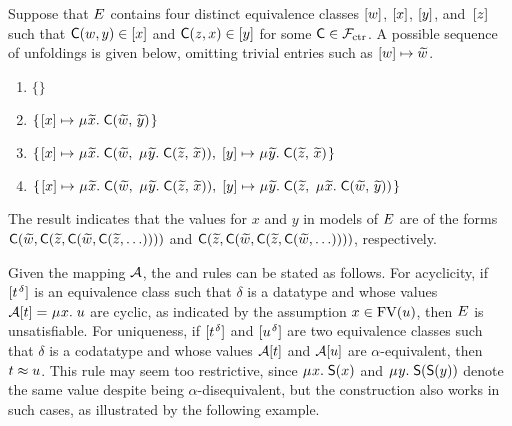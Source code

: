 \begin{examplex}
Suppose that $E$ contains four distinct equivalence classes $[w]$, $[x]$, $[y]$, and~$[z]$
such that $\textsf{C}(w,y) \in [x]$ and $\textsf{C}(z,x) \in [y]$ for some $\textsf{C} \in \mathcal{F}_{\mathrm{ctr}}$.
A possible sequence of unfoldings is given below, omitting
trivial entries such as $[w] \mapsto {\widetilde{w}}$.
%
\begin{enumerate}
\item \noindent{}$\{  \}$
\item \noindent{}$\{\vthinspace  \ec{x} \mapsto \MU {\Varec{x}}.\; \const{C}( {\Varec{w}},\, {\Varec{y}} ) \vthinspace\}$
\item \noindent{}$\{\vthinspace  \ec{x} \mapsto \MU {\Varec{x}}.\; \const{C}( {\Varec{w}},\; \MU {\Varec{y}}.\; \const{C}( {\Varec{z}},\, {\Varec{x}} ) ),\;
  \ec{y} \mapsto \MU {\Varec{y}}.\; \const{C}( {\Varec{z}},\, {\Varec{x}} ) \vthinspace\}$
\item \noindent{}$\{\vthinspace  \ec{x} \mapsto \MU {\Varec{x}}.\; \const{C}( {\Varec{w}},\; \MU {\Varec{y}}.\; \const{C}( {\Varec{z}},\, {\Varec{x}} ) ),\;
  \ec{y} \mapsto \MU {\Varec{y}}.\; \const{C}( {\Varec{z}},\; \MU {\Varec{x}}.\; \const{C}( {\Varec{w}},\, {\Varec{y}} ) ) \vthinspace\}$
\end{enumerate}
%
The result indicates that the values for $x$ and $y$ in models of $E$
are of the forms $\textsf{C}( {\widetilde{w}},\allowbreak \textsf{C}( {\widetilde{z}},\allowbreak \textsf{C}( {\widetilde{w}},\allowbreak \textsf{C}( {\widetilde{z}},\ldots ))))$
and $\textsf{C}( {\widetilde{z}}, \textsf{C}( {\widetilde{w}}, \textsf{C}( {\widetilde{z}}, \textsf{C}( {\widetilde{w}}, \ldots ))))$,
respectively. %
\xend
\end{examplex}

Given the mapping $\mathcal{A}$, the  and  rules can be stated as follows.
For acyclicity, if $\ec{t\typ{\delta}}$ is an equivalence class such that $\delta$ is a datatype and
whose %
values $\Val \ec{t} = \MU x.\; u$ are cyclic,
as indicated by the assumption $x \in \mathrm{FV}( u )$,
then $E$ is unsatisfiable.
For uniqueness, if $\ec{t\typ{\delta}}$ and $\ec{u\typ{\delta}}$ are two equivalence classes such
that $\delta$ is a codatatype and
whose %
values $\mathcal{A} [t]$ and $\mathcal{A} [u]$ are $\alpha$-equivalent,
then $t \approx u$. This rule may seem too restrictive, since
$\MU x.\; \const{S}(x)$ and $\MU y.\; \const{S}(\const{S}(y))$ denote the same
value despite being $\alpha$-disequivalent, but the construction also works in
such cases, as illustrated by the following example.

